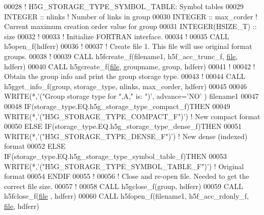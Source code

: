 \begin{DoxyCode}
00028                           \textcolor{comment}{!   H5G\_STORAGE\_TYPE\_SYMBOL\_TABLE: Symbol tables}
00029   \textcolor{keywordtype}{INTEGER} :: nlinks       \textcolor{comment}{! Number of links in group}
00030   \textcolor{keywordtype}{INTEGER} :: max\_corder   \textcolor{comment}{! Current maximum creation order value for group}
00031   \textcolor{keywordtype}{INTEGER(HSIZE\_T)} :: size
00032   \textcolor{comment}{!}
00033   \textcolor{comment}{! Initialize FORTRAN interface.}
00034   \textcolor{comment}{!}
00035   \textcolor{keyword}{CALL }h5open\_f(hdferr)
00036   \textcolor{comment}{!}
00037   \textcolor{comment}{! Create file 1.  This file will use original format groups.}
00038   \textcolor{comment}{!}
00039   \textcolor{keyword}{CALL }h5fcreate\_f(filename1, h5f\_acc\_trunc\_f, \hyperlink{structfile}{file}, hdferr)
00040   \textcolor{keyword}{CALL }h5gcreate\_f(\hyperlink{structfile}{file}, groupname, group, hdferr)
00041   \textcolor{comment}{!}
00042   \textcolor{comment}{! Obtain the group info and print the group storage type.}
00043   \textcolor{comment}{!}
00044   \textcolor{keyword}{CALL }h5gget\_info\_f(group, storage\_type, nlinks, max\_corder, hdferr)
00045 
00046   \textcolor{keyword}{WRITE}(*,\textcolor{stringliteral}{'("Group storage type for ",A," is: ")'}, advance=\textcolor{stringliteral}{'NO'} ) filename1
00047 
00048   \textcolor{keywordflow}{IF}(storage\_type.EQ.h5g\_storage\_type\_compact\_f)\textcolor{keywordflow}{THEN}
00049      \textcolor{keyword}{WRITE}(*,\textcolor{stringliteral}{'("H5G\_STORAGE\_TYPE\_COMPACT\_F")'}) \textcolor{comment}{! New compact format}
00050   \textcolor{keywordflow}{ELSE} \textcolor{keywordflow}{IF}(storage\_type.EQ.h5g\_storage\_type\_dense\_f)\textcolor{keywordflow}{THEN}
00051      \textcolor{keyword}{WRITE}(*,\textcolor{stringliteral}{'("H5G\_STORAGE\_TYPE\_DENSE\_F")'}) \textcolor{comment}{! New dense (indexed) format}
00052   \textcolor{keywordflow}{ELSE} \textcolor{keywordflow}{IF}(storage\_type.EQ.h5g\_storage\_type\_symbol\_table\_f)\textcolor{keywordflow}{THEN}
00053      \textcolor{keyword}{WRITE}(*,\textcolor{stringliteral}{'("H5G\_STORAGE\_TYPE\_SYMBOL\_TABLE\_F")'}) \textcolor{comment}{! Original format}
00054 \textcolor{keywordflow}{  ENDIF}
00055   \textcolor{comment}{!}
00056   \textcolor{comment}{! Close and re-open file.  Needed to get the correct file size.}
00057   \textcolor{comment}{!}
00058   \textcolor{keyword}{CALL }h5gclose\_f(group, hdferr)
00059   \textcolor{keyword}{CALL }h5fclose\_f(\hyperlink{structfile}{file} , hdferr)
00060   \textcolor{keyword}{CALL }h5fopen\_f(filename1, h5f\_acc\_rdonly\_f, \hyperlink{structfile}{file}, hdferr)

\end{DoxyCode}
